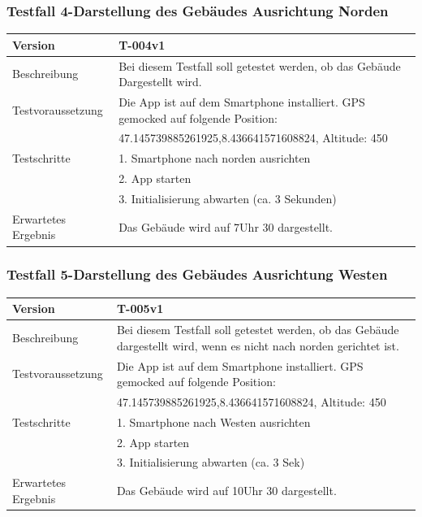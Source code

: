 \documentclass[a4paper]{scrreprt}
\begin{document}
\subsubsection{Testfall 4-Darstellung des Gebäudes Ausrichtung Norden}
\begin{tabularx}{\textwidth}{|l|X|}
\hline 
	Version &
	T-004v1 \\ 
\hline 
	Beschreibung & 
	Bei diesem Testfall soll getestet werden, ob das Gebäude Dargestellt wird.\\ 
\hline 
	Testvoraussetzung &
	Die App ist auf dem Smartphone installiert. GPS gemocked auf folgende Position: \\ & 
		47.145739885261925,8.436641571608824, Altitude: 450 \\ 
\hline 
	Testschritte & 
		1. Smartphone nach norden ausrichten \\ &
		2. App starten \\ &
		3. Initialisierung abwarten (ca. 3 Sekunden)\\
\hline
	Erwartetes Ergebnis &
	Das Gebäude wird auf 7Uhr 30 dargestellt. \\ 
\hline 
\end{tabularx}
\subsubsection{Testfall 5-Darstellung des Gebäudes Ausrichtung Westen}
\begin{tabularx}{\textwidth}{|l|X|}
\hline 
	Version &
	T-005v1 \\ 
\hline 
	Beschreibung & 
	Bei diesem Testfall soll getestet werden, ob das Gebäude dargestellt wird, wenn es nicht nach norden gerichtet ist. \\ 
\hline 
	Testvoraussetzung &
	Die App ist auf dem Smartphone installiert. GPS gemocked auf folgende Position: \\ &
		47.145739885261925,8.436641571608824, Altitude: 450 \\ 
\hline 
	Testschritte & 
		1. Smartphone nach Westen ausrichten \\ &
		2. App starten \\ &
		3. Initialisierung abwarten (ca. 3 Sek) \\
\hline
	Erwartetes Ergebnis &
	Das Gebäude wird auf 10Uhr 30 dargestellt. \\ 
\hline 
\end{tabularx}
\end{document}
